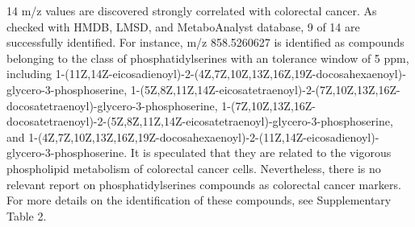 \documentclass[journal=jacsat,manuscript=article]{achemso}
\begin{document}
14 m/z values are discovered 
strongly correlated with colorectal cancer. As checked with HMDB, LMSD, 
and MetaboAnalyst database, 
9 of 14 are successfully identified. For instance, m/z 858.5260627 
is identified as compounds belonging to the class of phosphatidylserines 
with an  tolerance window of 5 ppm, including 
1-(11Z,14Z-eicosadienoyl)-2-(4Z,7Z,10Z,13Z,16Z,19Z-docosahexaenoyl)-glycero-3-phosphoserine, 
1-(5Z,8Z,11Z,14Z-eicosatetraenoyl)-2-(7Z,10Z,13Z,16Z-docosatetraenoyl)-glycero-3-phosphoserine, 
1-(7Z,10Z,13Z,16Z-docosatetraenoyl)-2-(5Z,8Z,11Z,14Z-eicosatetraenoyl)-glycero-3-phosphoserine, 
and 1-(4Z,7Z,10Z,13Z,16Z,19Z-docosahexaenoyl)-2-(11Z,14Z-eicosadienoyl)-glycero-3-phosphoserine. 
It is speculated that they are related 
to the vigorous phospholipid metabolism of colorectal cancer cells. Nevertheless, 
there is no relevant report on phosphatidylserines compounds as colorectal cancer markers. 
For more details on the identification of these compounds, see Supplementary Table 2.
\end{document}
